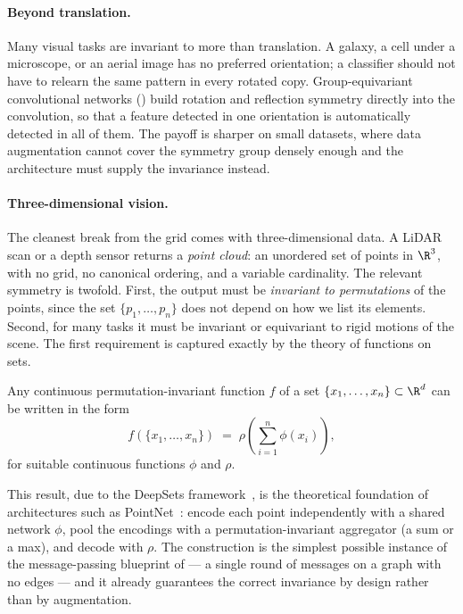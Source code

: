 \paragraph{Beyond translation.}
Many visual tasks are invariant to more than translation. A galaxy, a cell
under a microscope, or an aerial image has no preferred orientation; a
classifier should not have to relearn the same pattern in every rotated copy.
Group-equivariant convolutional networks () build rotation and
reflection symmetry directly into the convolution, so that a feature detected in
one orientation is automatically detected in all of them. The payoff is sharper
on small datasets, where data augmentation cannot cover the symmetry group
densely enough and the architecture must supply the invariance instead.

\paragraph{Three-dimensional vision.}
The cleanest break from the grid comes with three-dimensional data. A LiDAR
scan or a depth sensor returns a \emph{point cloud}: an unordered set of points
in $\R^3$, with no grid, no canonical ordering, and a variable cardinality. The
relevant symmetry is twofold. First, the output must be \emph{invariant to
permutations} of the points, since the set $\{p_1,\dots,p_n\}$ does not depend on
how we list its elements. Second, for many tasks it must be invariant or
equivariant to rigid motions of the scene. The first requirement is captured
exactly by the theory of functions on sets.

\begin{theorem}
\label{thm:apps:deepsets}
Any continuous permutation-invariant function $f$ of a set
$\{x_1,\dots,x_n\}\subset\R^d$ can be written in the form
\[
  f(\{x_1,\dots,x_n\}) \;=\; \rho\!\left(\sum_{i=1}^n \phi(x_i)\right),
\]
for suitable continuous functions $\phi$ and $\rho$.
\end{theorem}

This result, due to the DeepSets framework~\citep{zaheer2017deepsets}, is the
theoretical foundation of architectures such as
PointNet~\citep{qi2017pointnet}: encode each point independently with a shared
network $\phi$, pool the encodings with a permutation-invariant aggregator (a
sum or a max), and decode with $\rho$. The construction is the simplest possible
instance of the message-passing blueprint of  --- a single
round of messages on a graph with no edges --- and it already guarantees the
correct invariance by design rather than by augmentation.

